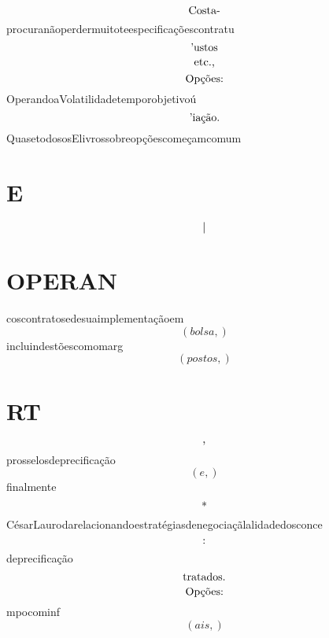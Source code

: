 \documentclass{article}
\begin{document}
\begin{equation}
$Costa-$
\end{equation}procuranãoperdermuitoteespecificaçõescontratu\begin{equation}
$'ustos$
\end{equation}\begin{equation}
$etc.,$
\end{equation}\begin{equation}
$Opções:$
\end{equation}OperandoaVolatilidadetemporobjetivoú\begin{equation}
$'iação.$
\end{equation}QuasetodososElivrossobreopçõescomeçamcomum\section{E}\begin{equation}
$|$
\end{equation}\section{OPERAN}coscontratosedesuaimplementaçãoem\begin{equation}
\left( bolsa,\right)
\end{equation}incluindestõescomomarg\begin{equation}
\left( postos,\right)
\end{equation}\section{RT}\begin{equation}
$,$
\end{equation}prosselosdeprecificação\begin{equation}
\left( e,\right)
\end{equation}finalmente\begin{equation}
$*$
\end{equation}CésarLaurodarelacionandoestratégiasdenegociaçãlalidadedosconce\begin{equation}
$:$
\end{equation}deprecificação\begin{equation}
$tratados.$
\end{equation}\begin{equation}
$Opções:$
\end{equation}mpocominf\begin{equation}
\left( ais,\right)
\end{equation}\begin{equation}

\end{equation}
\end{document}
